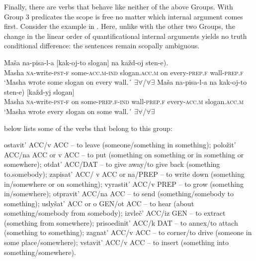 \documentclass[output=paper,colorlinks,citecolor=brown,modfonts,nonflat]{langsci/langscibook}
\begin{document}
Finally, there are verbs that behave like neither of the above Groups. With Group 3 predicates the scope is free no matter which internal argument comes first. Consider the example in . Here, unlike with the other two Groups, the change in the linear order of quantificational internal arguments yields no truth conditional difference: the sentences remain scopally ambiguous.

\ea%
    \label{ex:antonyuk:17}
    \ea \label{ex:antonyuk:17a}
    \gll    Maša na-pisa-l-a [kak-oj-to	slogan] na každ-oj sten-e).\\
            Masha \textsc{na-}write\textsc{-pst-f} \hspaceThis{[}some\textsc{-acc.m-ind} slogan\textsc{.acc.m} on every\textsc{-prep.f} wall\textsc{-prep.f}\\
    \glt    `Masha wrote some slogan on every wall.´ 
            \hfill ${\exists}{\forall}$/${\forall}{\exists}$
    \ex \label{ex:antonyuk:17b}
    \gll    Maša na-pisa-l-a na kak-oj-to sten-e) [každ-yj slogan]\\
            Masha \textsc{na-}write\textsc{-pst-f} on some\textsc{-prep.f-ind} wall\textsc{-prep.f} \hspaceThis{[}every\textsc{-acc.m} slogan\textsc{.acc.m}\\
    \glt    `Masha wrote every slogan on some wall.´ 
            \hfill ${\exists}{\forall}$/${\forall}{\exists}$
    \z
\z

 below lists some of the verbs that belong to this group:

\ea%
    \label{ex:antonyuk:18}
    \ea \label{ex:antonyuk:18a}
    ostavit’ ACC/v ACC – to leave (someone/something in something);
    \ex \label{ex:antonyuk:18b}
    položit’ ACC/na ACC or v ACC – to put (something on something or in something or somewhere);
    \ex \label{ex:antonyuk:18c}
    otdat’ ACC/DAT – to give away/to give back (something to.somebody);
    \ex \label{ex:antonyuk:18d}
    zapisat’ ACC/ v ACC or na/PREP – to write down (something in/somewhere or on something);
    \ex \label{ex:antonyuk:18e}
    vyrastit’ ACC/v PREP – to grow (something in/somewhere);
    \ex \label{ex:antonyuk:18f}
    otpravit’ ACC/na ACC – to send (something/somebody to something);
    \ex \label{ex:antonyuk:18g}
    uslyšat’ ACC or o GEN/ot ACC – to hear (about something/somebody from somebody);
    \ex \label{ex:antonyuk:18h}
    izvleč’ ACC/iz GEN – to extract (something from somewhere);
    \ex \label{ex:antonyuk:18i}
    prisoedinit’ ACC/k DAT – to annex/to attach (something to something);
    \ex \label{ex:antonyuk:18j}
    zagnat’ ACC/v ACC – to corner/to drive (someone in some place/somewhere);
    \ex \label{ex:antonyuk:18k}
    vstavit’ ACC/v ACC – to insert (something into something/somewhere).
    \z
\z
\end{document}
